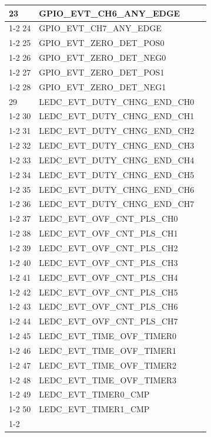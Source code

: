 \documentclass[main\_\_CN.tex]{subfiles}
\begin{document}
\begin{longtable}{ | l | l | l | }
23  & GPIO\_EVT\_CH6\_ANY\_EDGE &  \\ \cline{1-2}
24  & GPIO\_EVT\_CH7\_ANY\_EDGE &  \\ \cline{1-2}
25  & GPIO\_EVT\_ZERO\_DET\_POS0 &  \\ \cline{1-2}
26  & GPIO\_EVT\_ZERO\_DET\_NEG0 &  \\ \cline{1-2}
27  & GPIO\_EVT\_ZERO\_DET\_POS1 &  \\ \cline{1-2}
28  & GPIO\_EVT\_ZERO\_DET\_NEG1 &  \\ \hline
29  & LEDC\_EVT\_DUTY\_CHNG\_END\_CH0  & \nameref{mod:ledpwm}\\ \cline{1-2}
30  & LEDC\_EVT\_DUTY\_CHNG\_END\_CH1  & \\ \cline{1-2}
31  & LEDC\_EVT\_DUTY\_CHNG\_END\_CH2  & \\ \cline{1-2}
32  & LEDC\_EVT\_DUTY\_CHNG\_END\_CH3  & \\ \cline{1-2}
33  & LEDC\_EVT\_DUTY\_CHNG\_END\_CH4  & \\ \cline{1-2}
34  & LEDC\_EVT\_DUTY\_CHNG\_END\_CH5  & \\ \cline{1-2}
35  & LEDC\_EVT\_DUTY\_CHNG\_END\_CH6  & \\ \cline{1-2}
36  & LEDC\_EVT\_DUTY\_CHNG\_END\_CH7  & \\ \cline{1-2}
37  & LEDC\_EVT\_OVF\_CNT\_PLS\_CH0    & \\ \cline{1-2}
38  & LEDC\_EVT\_OVF\_CNT\_PLS\_CH1    & \\ \cline{1-2}
39  & LEDC\_EVT\_OVF\_CNT\_PLS\_CH2    & \\ \cline{1-2}
40  & LEDC\_EVT\_OVF\_CNT\_PLS\_CH3    & \\ \cline{1-2}
41  & LEDC\_EVT\_OVF\_CNT\_PLS\_CH4    & \\ \cline{1-2}
42  & LEDC\_EVT\_OVF\_CNT\_PLS\_CH5    & \\ \cline{1-2}
43  & LEDC\_EVT\_OVF\_CNT\_PLS\_CH6    & \\ \cline{1-2}
44  & LEDC\_EVT\_OVF\_CNT\_PLS\_CH7    & \\ \cline{1-2}
45  & LEDC\_EVT\_TIME\_OVF\_TIMER0     & \\ \cline{1-2}
46  & LEDC\_EVT\_TIME\_OVF\_TIMER1     & \\ \cline{1-2}
47  & LEDC\_EVT\_TIME\_OVF\_TIMER2     & \\ \cline{1-2}
48  & LEDC\_EVT\_TIME\_OVF\_TIMER3     & \\ \cline{1-2}
49  & LEDC\_EVT\_TIMER0\_CMP    & \\ \cline{1-2}
50  & LEDC\_EVT\_TIMER1\_CMP    & \\ \cline{1-2}

\end{longtable}
\end{document}
